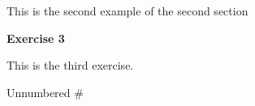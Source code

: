 \documentclass[]{article}
\providecommand{\tightlist}{%
  \setlength{\itemsep}{0pt}\setlength{\parskip}{0pt}}
\begin{document}
\begin{description}
\tightlist
\item[\phantomsection\addcontentsline{example}{example}{\protect\numberline {2.2}{\ignorespaces {Example}}}\protect\hypertarget{example:2.2}{}{\label{example:2.2}\textbf{Example
2}}]
This is the second example of the second section
\end{description}

\protect\hypertarget{exercise:last}{}{\label{exercise:last}\textbf{Exercise
3}}

This is the third exercise.

Unnumbered \#
\end{document}
